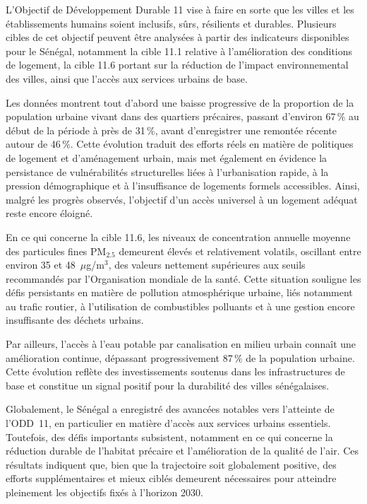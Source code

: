 L’Objectif de Développement Durable 11 vise à faire en sorte que les villes et les établissements humains soient inclusifs, sûrs, résilients et durables. Plusieurs cibles de cet objectif peuvent être analysées à partir des indicateurs disponibles pour le Sénégal, notamment la cible 11.1 relative à l’amélioration des conditions de logement, la cible 11.6 portant sur la réduction de l’impact environnemental des villes, ainsi que l’accès aux services urbains de base.

Les données montrent tout d’abord une baisse progressive de la proportion de la population urbaine vivant dans des quartiers précaires, passant d’environ 67\,\% au début de la période à près de 31\,\%, avant d’enregistrer une remontée récente autour de 46\,\%. Cette évolution traduit des efforts réels en matière de politiques de logement et d’aménagement urbain, mais met également en évidence la persistance de vulnérabilités structurelles liées à l’urbanisation rapide, à la pression démographique et à l’insuffisance de logements formels accessibles. Ainsi, malgré les progrès observés, l’objectif d’un accès universel à un logement adéquat reste encore éloigné.

En ce qui concerne la cible 11.6, les niveaux de concentration annuelle moyenne des particules fines PM$_{2.5}$ demeurent élevés et relativement volatils, oscillant entre environ 35 et 48~$\mu$g/m$^3$, des valeurs nettement supérieures aux seuils recommandés par l’Organisation mondiale de la santé. Cette situation souligne les défis persistants en matière de pollution atmosphérique urbaine, liés notamment au trafic routier, à l’utilisation de combustibles polluants et à une gestion encore insuffisante des déchets urbains.

Par ailleurs, l’accès à l’eau potable par canalisation en milieu urbain connaît une amélioration continue, dépassant progressivement 87\,\% de la population urbaine. Cette évolution reflète des investissements soutenus dans les infrastructures de base et constitue un signal positif pour la durabilité des villes sénégalaises.

Globalement, le Sénégal a enregistré des avancées notables vers l’atteinte de l’ODD~11, en particulier en matière d’accès aux services urbains essentiels. Toutefois, des défis importants subsistent, notamment en ce qui concerne la réduction durable de l’habitat précaire et l’amélioration de la qualité de l’air. Ces résultats indiquent que, bien que la trajectoire soit globalement positive, des efforts supplémentaires et mieux ciblés demeurent nécessaires pour atteindre pleinement les objectifs fixés à l’horizon 2030.


